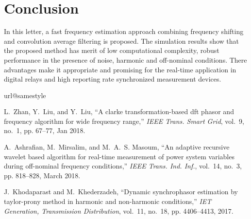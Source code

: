 \documentclass[journal,twoside]{IEEEtran}
\begin{document}
\section{Conclusion}
In this letter, a fast  frequency estimation approach combining frequency shifting and convolution average filtering is proposed. The simulation results show that the proposed method has merit of low computational complexity, robust performance in the presence of noise, harmonic and off-nominal conditions. There advantages make it appropriate and promising for the real-time application in digital relays and  high reporting rate synchronized measurement devices.

%
\begin{thebibliography}{10}
	\providecommand{\url}[1]{#1}
	\csname url@samestyle\endcsname
	\providecommand{\newblock}{\relax}
	\providecommand{\bibinfo}[2]{#2}
	\providecommand{\BIBentrySTDinterwordspacing}{\spaceskip=0pt\relax}
	\providecommand{\BIBentryALTinterwordstretchfactor}{4}
	\providecommand{\BIBentryALTinterwordspacing}{\spaceskip=\fontdimen2\font plus
		\BIBentryALTinterwordstretchfactor\fontdimen3\font minus
		\fontdimen4\font\relax}
	\providecommand{\BIBforeignlanguage}[2]{{%
			\expandafter\ifx\csname l@#1\endcsname\relax
			\typeout{** WARNING: IEEEtran.bst: No hyphenation pattern has been}%
			\typeout{** loaded for the language `#1'. Using the pattern for}%
			\typeout{** the default language instead.}%
			\else
			\language=\csname l@#1\endcsname
			\fi
			#2}}
	\providecommand{\BIBdecl}{\relax}
	\BIBdecl
	
	L.~Zhan, Y.~Liu, and Y.~Liu, ``A clarke transformation-based dft phasor and
	frequency algorithm for wide frequency range,'' \emph{IEEE Trans. Smart
		Grid}, vol.~9, no.~1, pp. 67--77, Jan 2018.
	
	A.~Ashrafian, M.~Mirsalim, and M.~A.~S. Masoum, ``An adaptive recursive wavelet
	based algorithm for real-time measurement of power system variables during
	off-nominal frequency conditions,'' \emph{IEEE Trans. Ind. Inf.}, vol.~14,
	no.~3, pp. 818--828, March 2018.
	
	J.~Khodaparast and M.~Khederzadeh, ``Dynamic synchrophasor estimation by
	taylor-prony method in harmonic and non-harmonic conditions,'' \emph{IET
		Generation, Transmission Distribution}, vol.~11, no.~18, pp. 4406--4413,
	2017.
	

\end{thebibliography}
\end{document}
